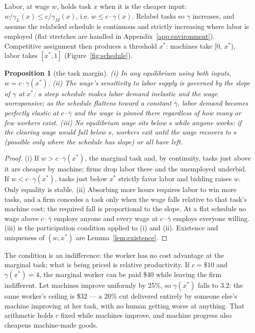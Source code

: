 \documentclass[12pt]{article}
\theoremstyle{plain}
\newtheorem{proposition}{Proposition}
\begin{document}
Labor, at wage $w$, holds task $x$ when it is the cheaper input: $w/\gamma _L(x) \le c/\gamma _M(x)$, i.e. $w \le c\cdot \gamma (x)$. Relabel tasks so $\gamma$ increases, and assume the relabeled schedule is continuous and strictly increasing where labor is employed (flat stretches are handled in Appendix~\ref{app:environment}). Competitive assignment then produces a threshold $x^*$: machines take [0, $x^*$), labor takes $[x^*, 1]$ (Figure~\ref{fig:schedule}).

\begin{proposition}[the task margin]\label{prop:margin}
(i) In any equilibrium using both inputs, $w = c\cdot \gamma (x^*)$. (ii) The wage's sensitivity to labor supply is governed by the slope of $\gamma$ at $x^*$: a steep schedule makes labor demand inelastic and the wage unresponsive; as the schedule flattens toward a constant $\bar{\gamma}$, labor demand becomes perfectly elastic at $c\cdot \bar{\gamma}$ and the wage is pinned there regardless of how many or few workers exist. (iii) No equilibrium wage sits below $s$ while anyone works: if the clearing wage would fall below $s$, workers exit until the wage recovers to $s$ (possible only where the schedule has slope) or all have left.
\end{proposition}

\begin{proof}
(i) If $w > c\cdot \gamma (x^*)$, the marginal task and, by continuity, tasks just above it are cheaper by machine; firms drop labor there and the unemployed underbid. If $w < c\cdot \gamma (x^*)$, tasks just below $x^*$ strictly favor labor and bidding raises $w$. Only equality is stable. (ii) Absorbing more hours requires labor to win more tasks, and a firm concedes a task only when the wage falls relative to that task's machine cost; the required fall is proportional to the slope. At a flat schedule no wage above $c\cdot \bar{\gamma}$ employs anyone and every wage at $c\cdot \bar{\gamma}$ employs everyone willing. (iii) is the participation condition applied to (i) and (ii). Existence and uniqueness of $(w, x^*)$ are Lemma~\ref{lem:existence}.
\end{proof}

The condition is an indifference: the worker has no cost advantage at the marginal task; what is being priced is relative productivity. If $c = \$10$ and $\gamma (x^*) = 4$, the marginal worker can be paid \$40 while leaving the firm indifferent. Let machines improve uniformly by 25\%, so $\gamma (x^*)$ falls to 3.2: the same worker's ceiling is \$32 --- a 20\% cut delivered entirely by someone else's machine improving at her task, with no human getting worse at anything. That arithmetic holds $c$ fixed while machines improve, and machine progress also cheapens machine-made goods.
\end{document}
